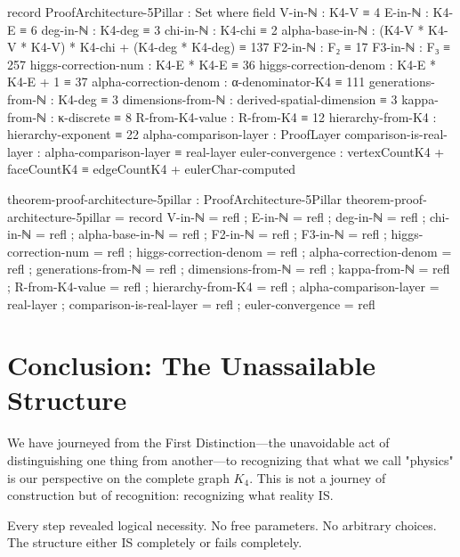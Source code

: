 \documentclass[11pt,a4paper]{book}
\begin{document}
\begin{code}
record ProofArchitecture-5Pillar : Set where
  field
    V-in-ℕ   : K4-V ≡ 4
    E-in-ℕ   : K4-E ≡ 6
    deg-in-ℕ : K4-deg ≡ 3
    chi-in-ℕ : K4-chi ≡ 2
    alpha-base-in-ℕ : (K4-V * K4-V * K4-V) * K4-chi + (K4-deg * K4-deg) ≡ 137
    F2-in-ℕ  : F₂ ≡ 17
    F3-in-ℕ  : F₃ ≡ 257
    higgs-correction-num   : K4-E * K4-E ≡ 36
    higgs-correction-denom : K4-E * K4-E + 1 ≡ 37
    alpha-correction-denom : α-denominator-K4 ≡ 111
    generations-from-ℕ     : K4-deg ≡ 3
    dimensions-from-ℕ      : derived-spatial-dimension ≡ 3
    kappa-from-ℕ           : κ-discrete ≡ 8
    R-from-K4-value        : R-from-K4 ≡ 12
    hierarchy-from-K4      : hierarchy-exponent ≡ 22
    alpha-comparison-layer   : ProofLayer
    comparison-is-real-layer : alpha-comparison-layer ≡ real-layer
    euler-convergence : vertexCountK4 + faceCountK4 ≡ edgeCountK4 + eulerChar-computed

theorem-proof-architecture-5pillar : ProofArchitecture-5Pillar
theorem-proof-architecture-5pillar = record
  { V-in-ℕ   = refl
  ; E-in-ℕ   = refl
  ; deg-in-ℕ = refl
  ; chi-in-ℕ = refl
  ; alpha-base-in-ℕ = refl
  ; F2-in-ℕ  = refl
  ; F3-in-ℕ  = refl
  ; higgs-correction-num   = refl
  ; higgs-correction-denom = refl
  ; alpha-correction-denom = refl
  ; generations-from-ℕ     = refl
  ; dimensions-from-ℕ      = refl
  ; kappa-from-ℕ           = refl
  ; R-from-K4-value        = refl
  ; hierarchy-from-K4      = refl
  ; alpha-comparison-layer   = real-layer
  ; comparison-is-real-layer = refl
  ; euler-convergence = refl
  }
\end{code}


\chapter{Conclusion: The Unassailable Structure}
\label{chap:conclusion}

We have journeyed from the First Distinction---the unavoidable act of distinguishing one thing from another---to recognizing that what we call "physics" is our perspective on the complete graph $K_4$. This is not a journey of construction but of recognition: recognizing what reality IS.

Every step revealed logical necessity. No free parameters. No arbitrary choices. The structure either IS completely or fails completely.
\end{document}

